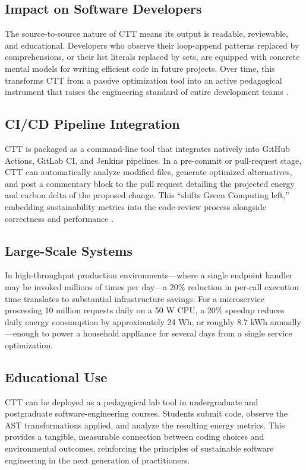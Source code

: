 \documentclass[conference]{IEEEtran}
\begin{document}
\subsection{Impact on Software Developers}
The source-to-source nature of CTT means its output is readable, reviewable,
and educational.  Developers who observe their loop-append patterns replaced
by comprehensions, or their list literals replaced by sets, are equipped with
concrete mental models for writing efficient code in future projects.  Over
time, this transforms CTT from a passive optimization tool into an active
pedagogical instrument that raises the engineering standard of entire
development teams \cite{ref6}.

\subsection{CI/CD Pipeline Integration}
CTT is packaged as a command-line tool that integrates natively into GitHub
Actions, GitLab CI, and Jenkins pipelines.  In a pre-commit or pull-request
stage, CTT can automatically analyze modified files, generate optimized
alternatives, and post a commentary block to the pull request detailing the
projected energy and carbon delta of the proposed change.  This ``shifts Green
Computing left,'' embedding sustainability metrics into the code-review process
alongside correctness and performance \cite{ref17}.

\subsection{Large-Scale Systems}
In high-throughput production environments---where a single endpoint handler
may be invoked millions of times per day---a 20\% reduction in per-call
execution time translates to substantial infrastructure savings.  For a
microservice processing 10 million requests daily on a 50 W CPU, a 20\%
speedup reduces daily energy consumption by approximately 24 Wh, or roughly
8.7 kWh annually---enough to power a household appliance for several days from
a single service optimization.

\subsection{Educational Use}
CTT can be deployed as a pedagogical lab tool in undergraduate and postgraduate
software-engineering courses.  Students submit code, observe the AST
transformations applied, and analyze the resulting energy metrics.  This
provides a tangible, measurable connection between coding choices and
environmental outcomes, reinforcing the principles of sustainable software
engineering in the next generation of practitioners.
\end{document}
